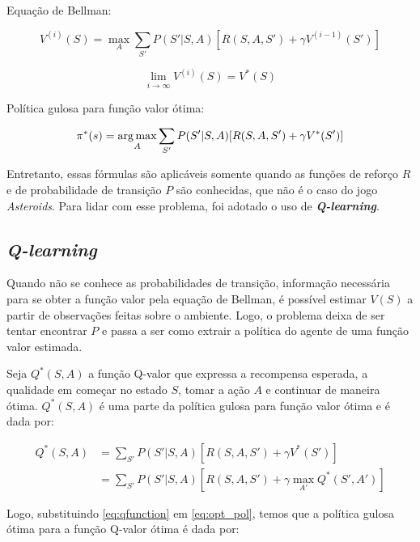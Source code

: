 Equação de Bellman:

\begin{equation} \label{eq:bellman}
V^{(i)}(S) = \max_{A}\sum_{S'}P(S'|S,A)[R(S,A,S') + \gamma V^{(i-1)}(S')]
\end{equation}

\begin{equation} \label{eq:qvalue}
\lim_{i\to\infty} V^{(i)}(S) = V^{*}(S)
\end{equation}

Política gulosa para função valor ótima:

\begin{equation} \label{eq:opt_pol}
\pi^{*}(s) = \operatorname*{arg\,max}_{A}\sum_{S'}P(S'|S,A)[R(S,A,S') + \gamma V^{*}(S')]
\end{equation}

Entretanto, essas fórmulas são aplicáveis somente quando as funções de reforço $R$ e de probabilidade de transição $P$ são conhecidas, que não é o caso do jogo \textit{Asteroids}. Para lidar com esse problema, foi adotado o uso de \textit{\textbf{Q-learning}}.

\subsection{\textit{Q-learning}}
\label{sec:ql}

Quando não se conhece as probabilidades de transição, informação necessária para se obter a função valor pela equação de Bellman, é possível estimar $V(S)$ a partir de observações feitas sobre o ambiente. Logo, o problema deixa de ser tentar encontrar $P$ e passa a ser como extrair a política do agente de uma função valor estimada.

Seja $Q^{*}(S,A)$ a função Q-valor que expressa a recompensa esperada, a qualidade em começar no estado $S$, tomar a ação $A$ e continuar de maneira ótima. $Q^{*}(S,A)$ é uma parte da política gulosa para função valor ótima e é dada por:

\begin{equation} \label{eq:qfunction}
\begin{align*}
Q^{*}(S,A) &= \sum_{S'}P(S'|S,A)[R(S,A,S') + \gamma V^{*}(S')] \\
        &= \sum_{S'}P(S'|S,A)[R(S,A,S') + \gamma \max_{A'}Q^{*}(S',A')]
\end{align*}
\end{equation}

Logo, substituindo \ref{eq:qfunction} em \ref{eq:opt_pol}, temos que a política gulosa ótima para a função Q-valor ótima é dada por:

